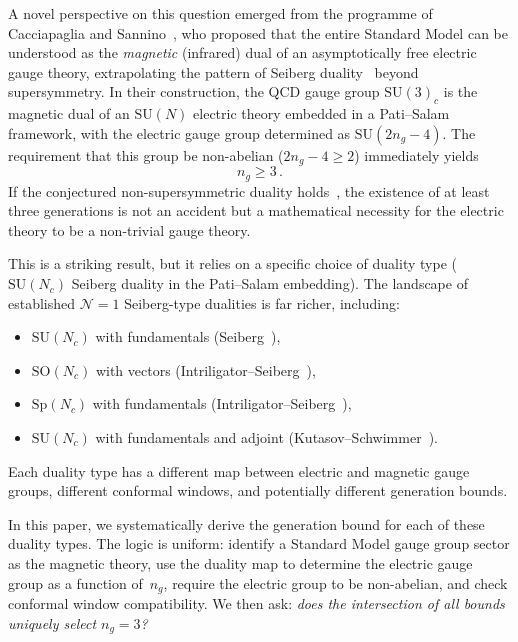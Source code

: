 \documentclass[11pt,a4paper]{article}
\theoremstyle{plain}
\theoremstyle{definition}
\theoremstyle{remark}
\newcommand{\Nc}{N_{\!c}}
\newcommand{\ngen}{n_g}
\newcommand{\SU}[1]{\mathrm{SU}(#1)}
\newcommand{\SO}[1]{\mathrm{SO}(#1)}
\newcommand{\Sp}[1]{\mathrm{Sp}(#1)}
\begin{document}
A novel perspective on this question emerged from the programme of
Cacciapaglia and Sannino~\cite{CacciapagliaSannino2024,Sannino2011},
who proposed that the entire Standard Model can be understood as the
\emph{magnetic} (infrared) dual of an asymptotically free electric gauge
theory, extrapolating the pattern of Seiberg
duality~\cite{Seiberg1995} beyond supersymmetry.  In their construction,
the QCD gauge group $\SU{3}_c$ is the magnetic dual of an $\SU{N}$
electric theory embedded in a Pati--Salam~\cite{PS1974} framework, with
the electric gauge group determined as $\SU{2\ngen - 4}$.  The requirement
that this group be non-abelian ($2\ngen - 4 \geq 2$) immediately yields
\begin{equation}\label{eq:CS-bound}
  \ngen \geq 3\,.
\end{equation}
If the conjectured non-supersymmetric duality
holds~\cite{AMPS2011,Sannino2011}, the existence of at least three
generations is not an accident but a mathematical necessity for the
electric theory to be a non-trivial gauge theory.

This is a striking result, but it relies on a specific choice of duality
type ($\SU{\Nc}$ Seiberg duality in the Pati--Salam embedding).  The
landscape of established $\mathcal{N}=1$ Seiberg-type dualities is far
richer, including:
\begin{itemize}
  \item $\SU{\Nc}$ with fundamentals (Seiberg~\cite{Seiberg1995}),
  \item $\SO{\Nc}$ with vectors
    (Intriligator--Seiberg~\cite{IS9506101}),
  \item $\Sp{\Nc}$ with fundamentals
    (Intriligator--Seiberg~\cite{IS9506101}),
  \item $\SU{\Nc}$ with fundamentals and adjoint
    (Kutasov--Schwimmer~\cite{KS9505004}).
\end{itemize}
Each duality type has a different map between electric and magnetic gauge
groups, different conformal windows, and potentially different generation
bounds.

In this paper, we systematically derive the generation bound for each of
these duality types.  The logic is uniform: identify a Standard Model
gauge group sector as the magnetic theory, use the duality map to
determine the electric gauge group as a function of~$\ngen$, require the
electric group to be non-abelian, and check conformal window
compatibility.  We then ask: \emph{does the intersection of all bounds
uniquely select $\ngen = 3$?}
\end{document}
